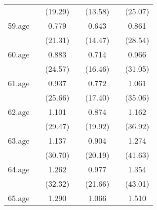 {\begin{tabular}{l*{6}{c}}
            &                     &     (19.29)         &                     &     (13.58)         &                     &     (25.07)         \\
[1em]
59.age      &                     &       0.779\sym{***}&                     &       0.643\sym{***}&                     &       0.861\sym{***}\\
            &                     &     (21.31)         &                     &     (14.47)         &                     &     (28.54)         \\
[1em]
60.age      &                     &       0.883\sym{***}&                     &       0.714\sym{***}&                     &       0.966\sym{***}\\
            &                     &     (24.57)         &                     &     (16.46)         &                     &     (31.05)         \\
[1em]
61.age      &                     &       0.937\sym{***}&                     &       0.772\sym{***}&                     &       1.061\sym{***}\\
            &                     &     (25.66)         &                     &     (17.40)         &                     &     (35.06)         \\
[1em]
62.age      &                     &       1.101\sym{***}&                     &       0.874\sym{***}&                     &       1.162\sym{***}\\
            &                     &     (29.47)         &                     &     (19.92)         &                     &     (36.92)         \\
[1em]
63.age      &                     &       1.137\sym{***}&                     &       0.904\sym{***}&                     &       1.274\sym{***}\\
            &                     &     (30.70)         &                     &     (20.19)         &                     &     (41.63)         \\
[1em]
64.age      &                     &       1.262\sym{***}&                     &       0.977\sym{***}&                     &       1.354\sym{***}\\
            &                     &     (32.32)         &                     &     (21.66)         &                     &     (43.01)         \\
[1em]
65.age      &                     &       1.290\sym{***}&                     &       1.066\sym{***}&                     &       1.510\sym{***}\\

\end{tabular}}
